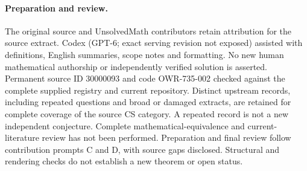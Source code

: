 \documentclass[11pt]{article}
\begin{document}
\paragraph{Preparation and review.}
The original source and UnsolvedMath contributors retain attribution for the source extract. Codex (GPT-6; exact serving revision not exposed) assisted with definitions, English summaries, scope notes and formatting. No new human mathematical authorship or independently verified solution is asserted. Permanent source ID 30000093 and code OWR-735-002 checked against the complete supplied registry and current repository. Distinct upstream records, including repeated questions and broad or damaged extracts, are retained for complete coverage of the source CS category. A repeated record is not a new independent conjecture. Complete mathematical-equivalence and current-literature review has not been performed. Preparation and final review follow contribution prompts C and D, with source gaps disclosed. Structural and rendering checks do not establish a new theorem or open status.
\label{end:30000093}
\end{document}
